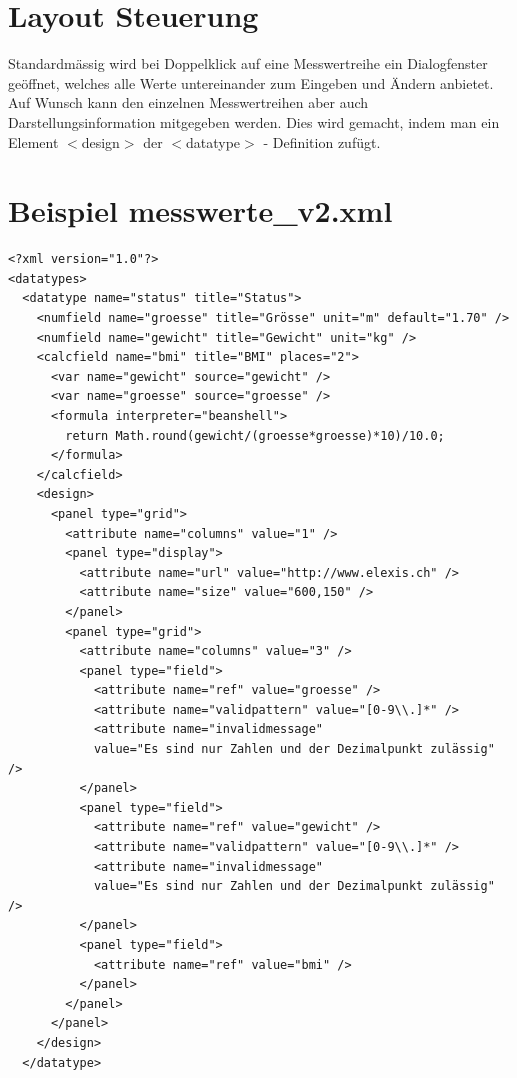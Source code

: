 \documentclass[a4paper]{scrartcl}
\begin{document}
\section{Layout Steuerung}
Standardmässig wird bei Doppelklick auf eine Messwertreihe ein Dialogfenster
geöffnet, welches alle Werte untereinander zum Eingeben und Ändern anbietet. Auf
Wunsch kann den einzelnen Messwertreihen aber auch Darstellungsinformation
mitgegeben werden. Dies wird gemacht, indem man ein Element $<$design$>$ der
$<$datatype$>$ - Definition zufügt.

\section{Beispiel messwerte\_v2.xml}
\begin{lstlisting}
<?xml version="1.0"?>
<datatypes>
  <datatype name="status" title="Status">
    <numfield name="groesse" title="Grösse" unit="m" default="1.70" />
    <numfield name="gewicht" title="Gewicht" unit="kg" />
    <calcfield name="bmi" title="BMI" places="2">
      <var name="gewicht" source="gewicht" />
      <var name="groesse" source="groesse" />
      <formula interpreter="beanshell">
        return Math.round(gewicht/(groesse*groesse)*10)/10.0;
      </formula>
    </calcfield>
    <design>
      <panel type="grid">
        <attribute name="columns" value="1" />
        <panel type="display">
          <attribute name="url" value="http://www.elexis.ch" />
          <attribute name="size" value="600,150" />
        </panel>
        <panel type="grid">
          <attribute name="columns" value="3" />
          <panel type="field">
            <attribute name="ref" value="groesse" />
            <attribute name="validpattern" value="[0-9\\.]*" />
            <attribute name="invalidmessage"
            value="Es sind nur Zahlen und der Dezimalpunkt zulässig" />
          </panel>
          <panel type="field">
            <attribute name="ref" value="gewicht" />
            <attribute name="validpattern" value="[0-9\\.]*" />
            <attribute name="invalidmessage"
            value="Es sind nur Zahlen und der Dezimalpunkt zulässig" />
          </panel>
          <panel type="field">
            <attribute name="ref" value="bmi" />
          </panel>
        </panel>
      </panel>
    </design>
  </datatype>


\end{lstlisting}
\end{document}
